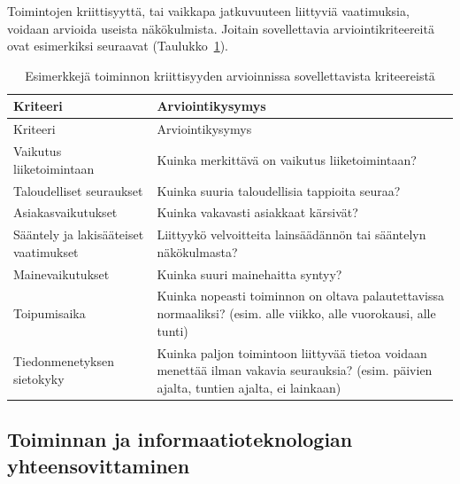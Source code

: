 \documentclass[
  finnish,
  letterpaper,
  DIV=11,
  numbers=noendperiod,
  oneside]{scrreprt}
\begin{document}
Toimintojen kriittisyyttä, tai vaikkapa jatkuvuuteen liittyviä
vaatimuksia, voidaan arvioida useista näkökulmista. Joitain
sovellettavia arviointikriteereitä ovat esimerkiksi seuraavat
(Taulukko~\ref{tbl-kriittisyys}).

\begin{longtable}[]{@{}
  >{\raggedright\arraybackslash}p{}
  >{\raggedright\arraybackslash}p{}@{}}
\caption{Esimerkkejä toiminnon kriittisyyden arvioinnissa
sovellettavista kriteereistä}\label{tbl-kriittisyys}\tabularnewline
\toprule\noalign{}
\begin{minipage}[b]{\linewidth}\raggedright
Kriteeri
\end{minipage} & \begin{minipage}[b]{\linewidth}\raggedright
Arviointikysymys
\end{minipage} \\
\midrule\noalign{}
\endfirsthead
\toprule\noalign{}
\begin{minipage}[b]{\linewidth}\raggedright
Kriteeri
\end{minipage} & \begin{minipage}[b]{\linewidth}\raggedright
Arviointikysymys
\end{minipage} \\
\midrule\noalign{}
\endhead
\bottomrule\noalign{}
\endlastfoot
Vaikutus liiketoimintaan & Kuinka merkittävä on vaikutus
liiketoimintaan? \\
Taloudelliset seuraukset & Kuinka suuria taloudellisia tappioita
seuraa? \\
Asiakasvaikutukset & Kuinka vakavasti asiakkaat kärsivät? \\
Sääntely ja lakisääteiset vaatimukset & Liittyykö velvoitteita
lainsäädännön tai sääntelyn näkökulmasta? \\
Mainevaikutukset & Kuinka suuri mainehaitta syntyy? \\
Toipumisaika & Kuinka nopeasti toiminnon on oltava palautettavissa
normaaliksi? (esim. alle viikko, alle vuorokausi, alle tunti) \\
Tiedonmenetyksen sietokyky & Kuinka paljon toimintoon liittyvää tietoa
voidaan menettää ilman vakavia seurauksia? (esim. päivien ajalta,
tuntien ajalta, ei lainkaan) \\
\end{longtable}

\subsection{Toiminnan ja informaatioteknologian
yhteensovittaminen}\label{toiminnan-ja-informaatioteknologian-yhteensovittaminen}
\end{document}
